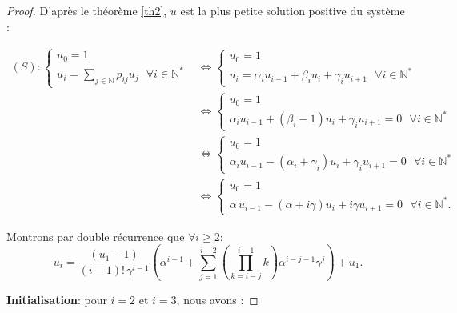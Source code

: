 \documentclass[12pt,a4paper]{report}
\theoremstyle{remark}
\begin{document}
\begin{proof}
D'après le théorème \ref{th2}, $u$ est la plus petite solution positive du système :

\begin{align*}
(S) : \left\{
\begin{array}{ll}
        u_0=1\\
        u_i= \sum\limits_{j\in \mathbb{N}} p_{ij}u_j \ \ \ \forall i \in \mathbb{N}^*
    \end{array}
\right.
&\Longleftrightarrow  \left\{
\begin{array}{ll}
        u_0=1\\
        u_i= \alpha_i u_{i-1} + \beta_i u_i + \gamma_i u_{i+1} \ \ \ \forall i \in \mathbb{N}^*
    \end{array}
\right.  \\
&\Longleftrightarrow \left\{
\begin{array}{ll}
        u_0=1\\
        \alpha_i u_{i-1} + (\beta_i-1) u_i + \gamma_i u_{i+1} = 0 \ \ \ \forall i \in \mathbb{N}^*
    \end{array}
\right.  \\
 &\Longleftrightarrow \left\{
\begin{array}{ll}
        u_0=1\\
        \alpha_i u_{i-1} - (\alpha_i+\gamma_i) u_i + \gamma_i u_{i+1} = 0 \ \ \ \forall i \in \mathbb{N}^*
    \end{array}
\right.  \\
 &\Longleftrightarrow \left\{
\begin{array}{ll}
        u_0=1\\
        \alpha \, u_{i-1} - (\alpha+ i\gamma) u_i + i\gamma u_{i+1} = 0 \ \ \ \forall i \in \mathbb{N}^*.
    \end{array}
\right.
\end{align*}

Montrons par double récurrence que $\forall i \geqslant 2$:
$$u_i = \frac{(u_1 - 1)}{(i-1)! \, \gamma^{i-1}} \left( \alpha^{i-1} + \sum_{j=1}^{i-2}\left(\prod_{k=i-j}^{i-1} k\right) \alpha^{i-j-1} \gamma^j \right) + u_1.$$

\textbf{Initialisation}: pour $i=2$ et $i=3$, nous avons :


\end{proof}
\end{document}
